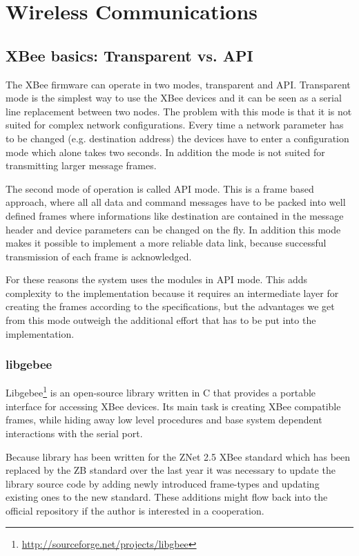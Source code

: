 \section{Wireless Communications}
\label{sec:wireless_communication_software}

\subsection{XBee basics: Transparent vs. API}
The XBee firmware can operate in two modes, transparent and API. Transparent mode is the simplest way to use the XBee devices and it can be seen as a serial line replacement between two nodes. The problem with this mode is that it is not suited for complex network configurations. Every time a network parameter has to be changed (e.g. destination address) the devices have to enter a configuration mode which alone takes two seconds. In addition the mode is not suited for transmitting larger message frames. 

The second mode of operation is called API mode. This is a frame based approach, where all all data and command messages have to be packed into well defined frames where informations like destination are contained in the message header and device parameters can be changed on the fly. In addition this mode makes it possible to implement a more reliable data link, because successful transmission of each frame is acknowledged.

For these reasons the system uses the modules in API mode. This adds complexity to the implementation because it requires an intermediate layer for creating the frames according to the specifications, but the advantages we get from this mode outweigh the additional effort that has to be put into the implementation. 


\subsubsection*{libgebee}
Libgebee\footnote{\url{http://sourceforge.net/projects/libgbee}} is an open-source library written in C that provides a portable interface for accessing XBee devices. Its main task is creating XBee compatible frames, while hiding away low level procedures and base system dependent interactions with the serial port.

Because library has been written for the ZNet 2.5 XBee standard which has been replaced by the ZB standard over the last year it was necessary to update the library source code by adding newly introduced frame-types and updating existing ones to the new standard. These additions might flow back into the official repository if the author is interested in a cooperation.

